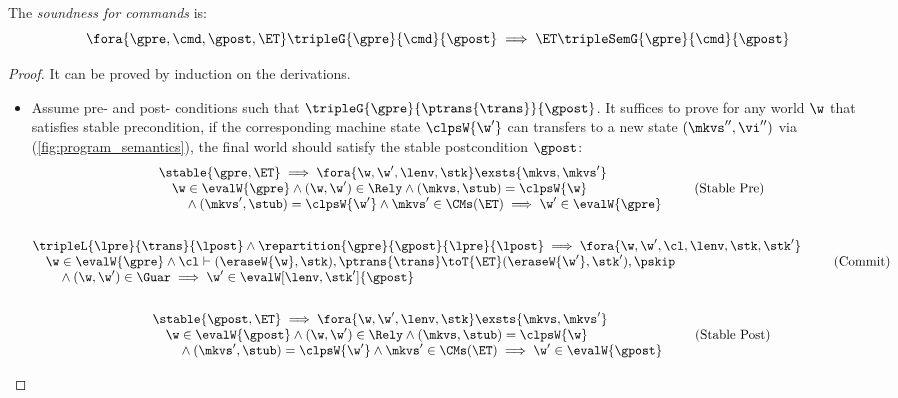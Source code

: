 \begin{theorem}
\label{thm:command-soundness}
\label{thm:per-thread-soundness}
The \emph{soundness for commands} is:
\[
    \fora{\gpre, \cmd, \gpost, \ET}
    \tripleG{\gpre}{\cmd}{\gpost} 
    \implies 
    \ET \tripleSemG{\gpre}{\cmd}{\gpost} 
\]
\end{theorem}
\begin{proof}
It can be proved by induction on the derivations.

\begin{itemize}

\item {}
Assume pre- and post- conditions such that \( \tripleG{\gpre}{\ptrans{\trans}}{\gpost}  \).
It suffices to prove for any world \( \w \) that satisfies stable precondition, if the corresponding machine state \(\clpsW{\w'}\) can transfers to a new state \((\mkvs'',\vi'')\) via  (\cref{fig:program_semantics}), the final world should satisfy the stable postcondition \(\gpost\):
\begin{gather}
    \begin{array}{@{}l}
    \stable{\gpre, \ET}  
    \implies 
    \fora{\w, \w',\lenv, \stk}  
    \exsts{ \mkvs, \mkvs' }  \\
    \quad \w \in \evalW{\gpre} 
    \land (\w, \w') \in \Rely 
    \land (\mkvs, \stub) = \clpsW{\w} \\
    \qquad {} \land (\mkvs', \stub) = \clpsW{\w'} 
    \land \mkvs' \in \CMs(\ET)
    \implies \w' \in \evalW{\gpre} 
    \end{array} \tag{Stable Pre} \label{equ:stable-pre-condition} \\
    \nonumber \\
%
    \begin{array}{@{}l}
    \tripleL{\lpre}{\trans}{\lpost}
    \land \repartition{\gpre}{\gpost}{\lpre}{\lpost}
    \implies 
    \fora{\w, \w', \cl, \lenv, \stk, \stk'}  \\
    \quad \w \in \evalW{\gpre} 
    \land \cl \vdash (\eraseW{\w}, \stk), \ptrans{\trans}  
    \toT{\ET} (\eraseW{\w'}, \stk'), \pskip \\
    \qquad {} \land (\w, \w') \in \Guar 
    \implies \w' \in \evalW[\lenv, \stk']{\gpost} 
    \end{array} \tag{Commit} \label{equ:commit-transaction} \\
    \nonumber \\
%
    \begin{array}{@{}l}
    \stable{\gpost, \ET}  
    \implies 
    \fora{\w, \w',\lenv, \stk}  
    \exsts{ \mkvs, \mkvs' } \\
    \quad \w \in \evalW{\gpost} 
    \land (\w, \w') \in \Rely 
    \land (\mkvs, \stub) = \clpsW{\w} \\
    \qquad {} \land (\mkvs', \stub) = \clpsW{\w'}
    \land \mkvs' \in \CMs(\ET)
    \implies \w' \in \evalW{\gpost} 
    \end{array} \tag{Stable Post} \label{equ:stable-post-condition} 
\end{gather}


\end{itemize}
\end{proof}
